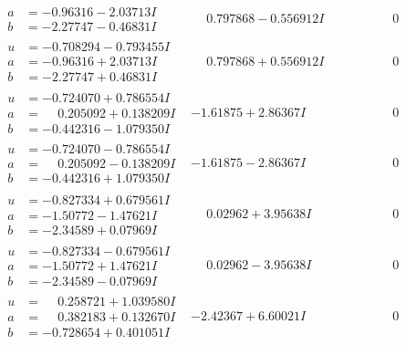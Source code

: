 \documentclass[1p]{elsarticle_modified}
\theoremstyle{definition}
\begin{document}
$$\begin{array}{c|c|c}
\begin{aligned}
a &= -0.96316 - 2.03713 I \\
b &= -2.27747 - 0.46831 I\end{aligned}
 & \phantom{-}0.797868 - 0.556912 I & \phantom{-0.000000 } 0 \\ \hline\begin{aligned}
u &= -0.708294 - 0.793455 I \\
a &= -0.96316 + 2.03713 I \\
b &= -2.27747 + 0.46831 I\end{aligned}
 & \phantom{-}0.797868 + 0.556912 I & \phantom{-0.000000 } 0 \\ \hline\begin{aligned}
u &= -0.724070 + 0.786554 I \\
a &= \phantom{-}0.205092 + 0.138209 I \\
b &= -0.442316 - 1.079350 I\end{aligned}
 & -1.61875 + 2.86367 I & \phantom{-0.000000 } 0 \\ \hline\begin{aligned}
u &= -0.724070 - 0.786554 I \\
a &= \phantom{-}0.205092 - 0.138209 I \\
b &= -0.442316 + 1.079350 I\end{aligned}
 & -1.61875 - 2.86367 I & \phantom{-0.000000 } 0 \\ \hline\begin{aligned}
u &= -0.827334 + 0.679561 I \\
a &= -1.50772 - 1.47621 I \\
b &= -2.34589 + 0.07969 I\end{aligned}
 & \phantom{-}0.02962 + 3.95638 I & \phantom{-0.000000 } 0 \\ \hline\begin{aligned}
u &= -0.827334 - 0.679561 I \\
a &= -1.50772 + 1.47621 I \\
b &= -2.34589 - 0.07969 I\end{aligned}
 & \phantom{-}0.02962 - 3.95638 I & \phantom{-0.000000 } 0 \\ \hline\begin{aligned}
u &= \phantom{-}0.258721 + 1.039580 I \\
a &= \phantom{-}0.382183 + 0.132670 I \\
b &= -0.728654 + 0.401051 I\end{aligned}
 & -2.42367 + 6.60021 I & \phantom{-0.000000 } 0 \\ \hline\begin{aligned}

\end{aligned}
\end{array}$$
\end{document}
